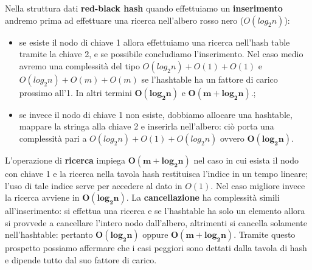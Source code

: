 \indent Nella struttura dati \textbf{red-black hash} quando effettuiamo un \textbf{inserimento} andremo prima
ad effettuare una ricerca nell'albero rosso nero ($O(log_2n)$):
\begin{itemize}
    \item se esiste il nodo di chiave 1 allora
effettuiamo una ricerca nell'hash table tramite la chiave 2, e se possibile concludiamo l'inserimento.
Nel caso medio avremo una complessit\`a del tipo
$O(log_2n) + O(1) + O(1)$ e $O(log_2n) + O(m) + O(m)$ se l'hashtable ha un fattore di carico prossimo
all'1. In altri termini $\mathbf{O(log_2n)}$ e $\mathbf{O(m+log_2n)}$.;
    \item se invece il nodo di chiave 1 non esiste, dobbiamo allocare una hashtable, mappare la stringa alla chiave 2
e inserirla nell'albero: ci\`o porta una complessit\`a pari a $O(log_2n) + O(1) +  O(log_2n)$ ovvero 
$\mathbf{O(log_2n)}$.
\end{itemize}
L'operazione di \textbf{ricerca} impiega $\mathbf{O(m+log_2n)}$ nel caso in cui esista il nodo
con chiave 1 e la ricerca nella tavola hash restituisca l'indice in un tempo lineare; l'uso di tale indice 
serve per accedere al dato in $O(1)$. Nel caso migliore invece la ricerca avviene in
$\mathbf{O(log_2n)}$.\newline
La \textbf{cancellazione} ha complessit\`a simili all'inserimento: si effettua una ricerca e
se l'hashtable ha solo un elemento allora si provvede a cancellare l'intero nodo dall'albero, altrimenti
si cancella solamente nell'hashtable: pertanto $\mathbf{O(log_2n)}$ oppure $\mathbf{O(m+log_2n)}$.
\newline
Tramite questo prospetto possiamo affermare che i casi peggiori sono dettati dalla tavola di hash e dipende
tutto dal suo fattore di carico.\newline